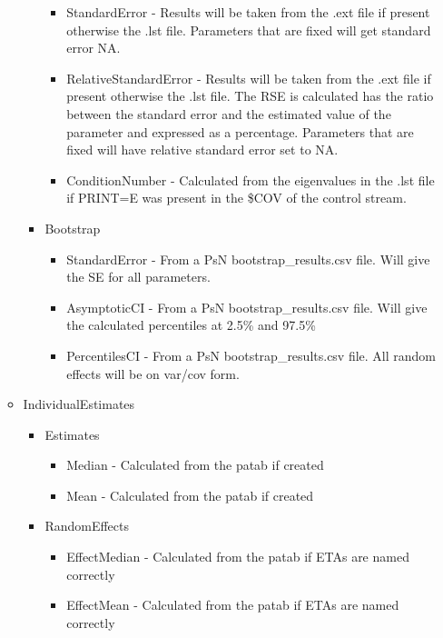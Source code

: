 \begin{itemize}
\begin{itemize}
\begin{itemize}
\begin{itemize}
                    \item StandardError - Results will be taken from the .ext file if present otherwise the .lst file. Parameters that are fixed will get standard error NA.
                    \item RelativeStandardError - Results will be taken from the .ext file if present otherwise the .lst file. The RSE is calculated has the ratio between the standard error and the estimated value of the parameter and expressed as a percentage. Parameters that are fixed will have relative standard error set to NA.
                    \item ConditionNumber - Calculated from the eigenvalues in the .lst file if PRINT=E was present in the \$COV of the control stream.
                \end{itemize}
                \item Bootstrap
                \begin{itemize}
                    \item StandardError - From a PsN bootstrap\_results.csv file. Will give the SE for all parameters. 
                    \item AsymptoticCI - From a PsN bootstrap\_results.csv file. Will give the calculated percentiles at 2.5\% and 97.5\%
                    \item PercentilesCI - From a PsN bootstrap\_results.csv file. All random effects will be on var/cov form.
                \end{itemize}
            \end{itemize}
            \item IndividualEstimates
            \begin{itemize}
                \item Estimates
                \begin{itemize}
                    \item Median - Calculated from the patab if created
                    \item Mean - Calculated from the patab if created
                \end{itemize}
                \item RandomEffects
                \begin{itemize}
                    \item EffectMedian - Calculated from the patab if ETAs are named correctly
                    \item EffectMean - Calculated from the patab if ETAs are named correctly

\end{itemize}
\end{itemize}
\end{itemize}
\end{itemize}
